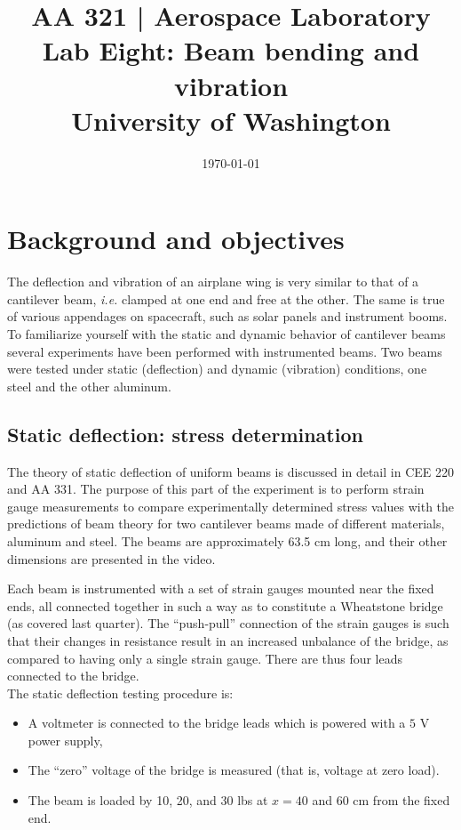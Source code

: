 \documentclass[12pt]{article}
\begin{document}
\title{\Large {\bf AA 321 | Aerospace Laboratory\\Lab Eight: Beam bending and vibration}\\[1ex]
  University of Washington}
\date{\today}
\maketitle

\section{Background and objectives}\label{objs}
The deflection and vibration of an airplane wing is very similar to that of a cantilever beam, \textit{i.e.} clamped at one end and free at the other. The same is true of various appendages on spacecraft, such as solar panels and instrument booms. To familiarize yourself with the static and dynamic behavior of cantilever beams several experiments have been performed with instrumented beams. Two beams were tested under static (deflection) and dynamic (vibration) conditions, one steel and the other aluminum.

\subsection{Static deflection: stress determination}
The theory of static deflection of uniform beams is discussed in detail in CEE 220 and AA 331. The purpose of this part of the experiment is to perform strain gauge measurements to compare experimentally determined stress values with the predictions of beam theory for two cantilever beams made of different materials, aluminum and steel. The beams are approximately 63.5 cm long, and their other dimensions are presented in the video.

Each beam is instrumented with a set of strain gauges mounted near the fixed ends, all connected together in such a way as to constitute a Wheatstone bridge (as covered last quarter). The ``push-pull'' connection of the strain gauges is such that their changes in resistance result in an increased unbalance of the bridge, as compared to having only a single strain gauge. There are thus four leads connected to the bridge.\\

\vspace{0.5cm}
The static deflection testing procedure is:
\begin{itemize}[noitemsep]
\item A voltmeter is connected to the bridge leads which is powered with a $5$ V power supply,
\item The ``zero'' voltage of the bridge is measured (that is, voltage at zero load).
\item The beam is loaded by 10, 20, and 30 lbs at $x=40$ and 60 cm from the fixed end.
\end{itemize}
\end{document}
